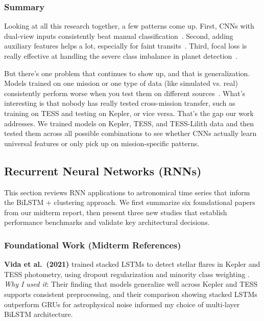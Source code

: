 \documentclass[letterpaper]{article} %
\begin{document}
\subsubsection{Summary}

Looking at all this research together, a few patterns come up. First, CNNs with dual-view inputs consistently beat manual classification~\cite{Shallue2018identifyexoplanetsI, Dattilo2019identifyexoplanetsII, Chaushev2019ngts}. Second, adding auxiliary features helps a lot, especially for faint transits~\cite{ansdell2018scientific}. Third, focal loss is really effective at handling the severe class imbalance in planet detection~\cite{lin2017focal}.

But there's one problem that continues to show up, and that is generalization. Models trained on one mission or one type of data (like simulated vs. real) consistently perform worse when you test them on different sources~\cite{Shallue2018identifyexoplanetsI, Osborn2019rapidclassificationtesscandidates}. What's interesting is that nobody has really tested cross-mission transfer, such as training on TESS and testing on Kepler, or vice versa. That's the gap our work addresses. We trained models on Kepler, TESS, and TESS-Lilith data and then tested them across all possible combinations to see whether CNNs actually learn universal features or only pick up on mission-specific patterns.

\subsection{Recurrent Neural Networks (RNNs)}

This section reviews RNN applications to astronomical time series that inform the BiLSTM + clustering approach. We first summarize six foundational papers from our midterm report, then present three new studies that establish performance benchmarks and validate key architectural decisions.

\subsubsection{Foundational Work (Midterm References)}

\textbf{Vida et al.\ (2021)} trained stacked LSTMs to detect stellar flares in Kepler and TESS photometry, using dropout regularization and minority class weighting \cite{Vida2021findingflaresrecurrent}. \textit{Why I used it}: Their finding that models generalize well across Kepler and TESS supports consistent preprocessing, and their comparison showing stacked LSTMs outperform GRUs for astrophysical noise informed my choice of multi-layer BiLSTM architecture.
\end{document}
